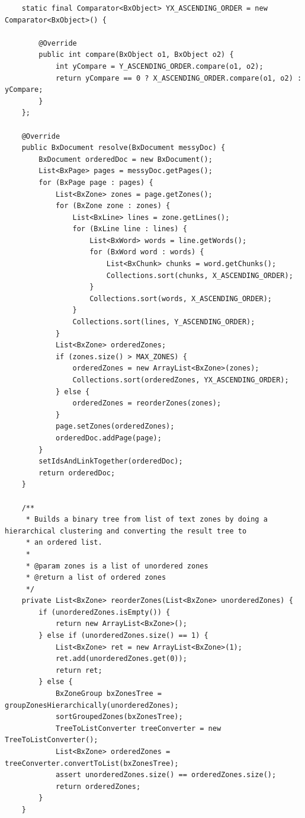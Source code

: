 \begin{appendix}
\begin{lstlisting}
    static final Comparator<BxObject> YX_ASCENDING_ORDER = new Comparator<BxObject>() {

        @Override
        public int compare(BxObject o1, BxObject o2) {
            int yCompare = Y_ASCENDING_ORDER.compare(o1, o2);
            return yCompare == 0 ? X_ASCENDING_ORDER.compare(o1, o2) : yCompare;
        }
    };

    @Override
    public BxDocument resolve(BxDocument messyDoc) {
        BxDocument orderedDoc = new BxDocument();
        List<BxPage> pages = messyDoc.getPages();
        for (BxPage page : pages) {
            List<BxZone> zones = page.getZones();
            for (BxZone zone : zones) {
                List<BxLine> lines = zone.getLines();
                for (BxLine line : lines) {
                    List<BxWord> words = line.getWords();
                    for (BxWord word : words) {
                        List<BxChunk> chunks = word.getChunks();
                        Collections.sort(chunks, X_ASCENDING_ORDER);
                    }
                    Collections.sort(words, X_ASCENDING_ORDER);
                }
                Collections.sort(lines, Y_ASCENDING_ORDER);
            }
            List<BxZone> orderedZones;
            if (zones.size() > MAX_ZONES) {
                orderedZones = new ArrayList<BxZone>(zones);
                Collections.sort(orderedZones, YX_ASCENDING_ORDER);
            } else {
                orderedZones = reorderZones(zones);
            }
            page.setZones(orderedZones);
            orderedDoc.addPage(page);
        }
        setIdsAndLinkTogether(orderedDoc);
        return orderedDoc;
    }

    /**
     * Builds a binary tree from list of text zones by doing a hierarchical clustering and converting the result tree to
     * an ordered list.
     *
     * @param zones is a list of unordered zones
     * @return a list of ordered zones
     */
    private List<BxZone> reorderZones(List<BxZone> unorderedZones) {
        if (unorderedZones.isEmpty()) {
            return new ArrayList<BxZone>();
        } else if (unorderedZones.size() == 1) {
            List<BxZone> ret = new ArrayList<BxZone>(1);
            ret.add(unorderedZones.get(0));
            return ret;
        } else {
            BxZoneGroup bxZonesTree = groupZonesHierarchically(unorderedZones);
            sortGroupedZones(bxZonesTree);
            TreeToListConverter treeConverter = new TreeToListConverter();
            List<BxZone> orderedZones = treeConverter.convertToList(bxZonesTree);
            assert unorderedZones.size() == orderedZones.size();
            return orderedZones;
        }
    }


\end{lstlisting}
\end{appendix}
